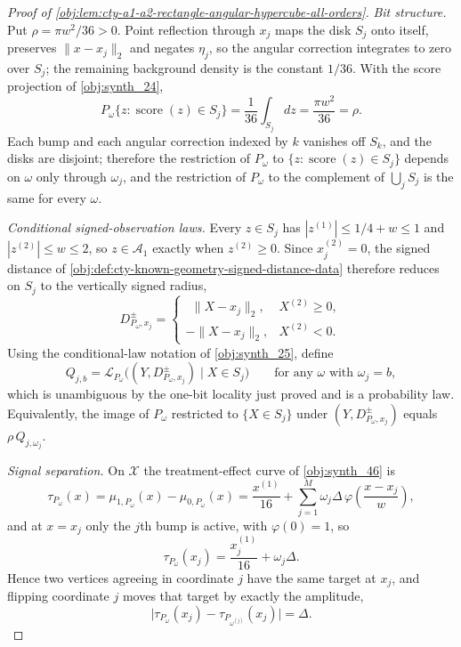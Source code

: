 \documentclass[11pt]{article}
\begin{document}
\begin{proof}[Proof of \cref{obj:lem:cty-a1-a2-rectangle-angular-hypercube-all-orders}]
\emph{Bit structure.}
Put \(\rho=\pi w^2/36>0\).  Point reflection through \(x_j\) maps the disk \(S_j\) onto itself, preserves \(\lVert x-x_j\rVert_2\) and negates \(\eta_j\), so the angular correction integrates to zero over \(S_j\); the remaining background density is the constant \(1/36\).  With the score projection of \cref{obj:synth_24},
\[
P_\omega\{z:\operatorname{score}(z)\in S_j\}
=
\frac1{36}\int_{S_j}dz
=
\frac{\pi w^2}{36}
=\rho .
\]
Each bump and each angular correction indexed by \(k\) vanishes off \(S_k\), and the disks are disjoint; therefore the restriction of \(P_\omega\) to \(\{z:\operatorname{score}(z)\in S_j\}\) depends on \(\omega\) only through \(\omega_j\), and the restriction of \(P_\omega\) to the complement of \(\bigcup_{j}S_j\) is the same for every \(\omega\).

\emph{Conditional signed-observation laws.}
Every \(z\in S_j\) has \(|z^{(1)}|\leq1/4+w\leq1\) and \(|z^{(2)}|\leq w\leq2\), so \(z\in\mathcal A_1\) exactly when \(z^{(2)}\geq0\).  Since \(x_j^{(2)}=0\), the signed distance of \cref{obj:def:cty-known-geometry-signed-distance-data} therefore reduces on \(S_j\) to the vertically signed radius,
\[
D^{\pm}_{P_\omega,x_j}
=
\begin{cases}
\ \ \lVert X-x_j\rVert_2, & X^{(2)}\geq 0,\\
-\lVert X-x_j\rVert_2, & X^{(2)}<0 .
\end{cases}
\]
Using the conditional-law notation of \cref{obj:synth_25}, define
\[
Q_{j,b}
=
\mathcal L_{P_\omega}\bigl((Y,D^{\pm}_{P_\omega,x_j})\mid X\in S_j\bigr)
\qquad\text{for any }\omega\text{ with }\omega_j=b ,
\]
which is unambiguous by the one-bit locality just proved and is a probability law.  Equivalently, the image of \(P_\omega\) restricted to \(\{X\in S_j\}\) under \((Y,D^{\pm}_{P_\omega,x_j})\) equals \(\rho\,Q_{j,\omega_j}\).

\emph{Signal separation.}
On \(\mathcal X\) the treatment-effect curve of \cref{obj:synth_46} is
\[
\tau_{P_\omega}(x)=\mu_{1,P_\omega}(x)-\mu_{0,P_\omega}(x)
=\frac{x^{(1)}}{16}+\sum_{j=1}^{M}\omega_j\Delta\,\varphi\!\left(\frac{x-x_j}{w}\right),
\]
and at \(x=x_j\) only the \(j\)th bump is active, with \(\varphi(0)=1\), so
\[
\tau_{P_\omega}(x_j)=\frac{x_j^{(1)}}{16}+\omega_j\Delta .
\]
Hence two vertices agreeing in coordinate \(j\) have the same target at \(x_j\), and flipping coordinate \(j\) moves that target by exactly the amplitude,
\[
\bigl|\tau_{P_\omega}(x_j)-\tau_{P_{\omega^{(j)}}}(x_j)\bigr|=\Delta .
\]


\end{proof}
\end{document}
